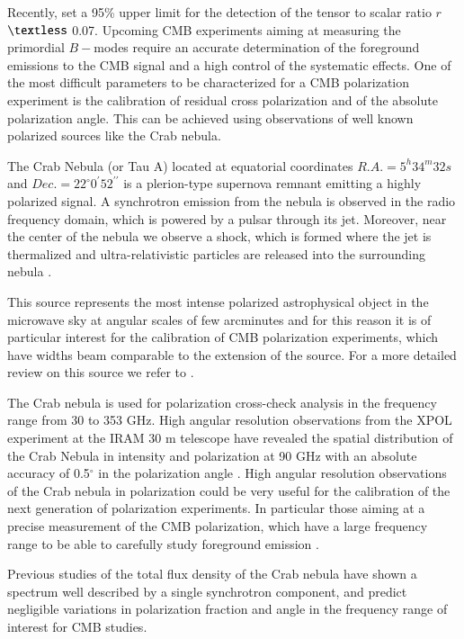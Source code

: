 \documentclass[twocolumn,traditabstract]{aa}
\begin{document}
Recently, \citet{bicepplanck2015,bicep2016} set a 95\% upper limit for the detection of the tensor to scalar ratio $r$ $\textless$ 0.07.
Upcoming CMB experiments aiming at measuring the primordial $B-$modes require an accurate determination of the foreground emissions to the CMB signal and a high control of the systematic effects. One of the most difficult parameters to be characterized for a CMB polarization experiment is the calibration of residual cross polarization and of the absolute polarization angle. This can be achieved using observations of well known polarized sources like the Crab nebula.

The Crab Nebula (or Tau A) located at equatorial coordinates $R.A. = 5^h34^m32s$ and $Dec. = 22^{\circ}0^{\prime}52^{\prime\prime}$ is a plerion-type supernova remnant emitting a highly polarized signal.
A synchrotron emission from the nebula is observed in the radio frequency domain, which is powered by a pulsar through its jet. 
Moreover, near the center of the nebula we observe a shock, which is formed where the jet is thermalized and ultra-relativistic particles are released into the surrounding nebula \citep{2000ApJ...536L..81W,2011A&A...528A..11W}. 

This source represents the most intense polarized astrophysical object in the microwave sky at angular scales of few arcminutes and for this reason it is of particular interest  for the calibration of CMB polarization experiments, which have widths beam comparable to the extension of the source.
For a more detailed review on this source we refer to \citet{2008ARA&A..46..127H}.

The Crab nebula is used for polarization cross-check analysis in the frequency range from 30 to 353 GHz. High angular resolution observations from the XPOL experiment \citep{thum2008} at the IRAM 30 m telescope have revealed the spatial distribution of the Crab Nebula in intensity and polarization at 90 GHz with an absolute accuracy of 0.5$^{\circ}$ in the polarization angle \citep{aumont2010}. 
High angular resolution observations of the Crab nebula in polarization could be very useful for the calibration of the next generation of polarization experiments. In particular those aiming at a precise measurement of the CMB polarization, which have a large frequency range to be able to carefully study foreground emission \citep{2016IJMPD..2540008K}. 

Previous studies \citep{macias2010} of the total flux density of the Crab nebula have shown a spectrum well described by a single synchrotron component, and predict negligible variations in polarization fraction and angle in the frequency range of interest for CMB studies.
 
\end{document}

